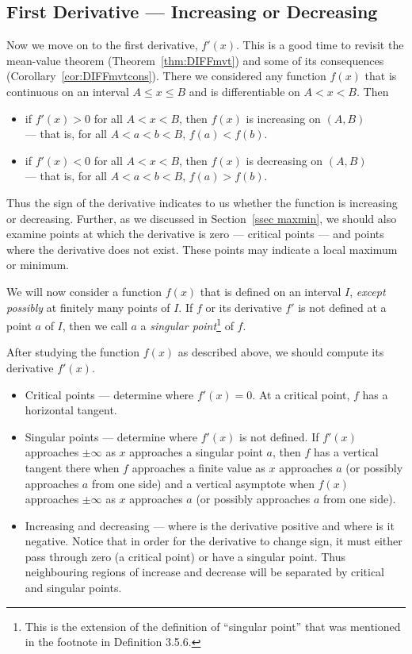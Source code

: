 \subsection{First Derivative --- Increasing or Decreasing}\label{ssec_sketch_FD}
Now we move on to the first derivative, $f'(x)$. This is a good time to revisit the
mean-value theorem (Theorem~\ref{thm:DIFFmvt}) and some of its consequences
(Corollary~\ref{cor:DIFFmvtcons}). There we considered any function $f(x)$ that is 
continuous on an interval $A\le x\le B$ and is differentiable on $A<x<B$. Then
\begin{itemize}
 \item if $f'(x)>0$ for all $A<x<B$, then $f(x)$ is increasing on $(A,B)$\\
  --- that is, for all $A<a<b<B$, $f(a)< f(b)$.
 \item if $f'(x)<0$ for all $A<x<B$, then $f(x)$ is decreasing on $(A,B)$\\
  --- that is, for all $A<a<b<B$, $f(a) > f(b)$.
\end{itemize}
Thus the sign of the derivative indicates to us whether the function is increasing or
decreasing. Further, as we discussed in Section~\ref{ssec maxmin}, we should also examine
points at which the derivative is zero --- critical points --- and points where the derivative
does not exist. These points may indicate a local maximum or minimum.

We will now consider a function $f(x)$ that is defined on an interval $I$, 
\emph{except possibly} at finitely many points of $I$. If $f$ or its derivative $f'$ 
is not defined at a point $a$ of $I$, then we call $a$ a 
\emph{singular point}\footnote{This is the extension of the definition of ``singular point'' that was mentioned in the footnote in Definition 3.5.6.} of $f$.

After studying the function $f(x)$ as described above, we should compute its derivative
$f'(x)$.
\begin{itemize}
 \item Critical points --- determine where $f'(x)=0$. At a critical point, $f$ has a
horizontal tangent.
 \item Singular points --- determine where $f'(x)$ is not defined.  If $f'(x)$
approaches $\pm\infty$ as $x$ approaches a singular point $a$, then $f$ has a
vertical tangent there when $f$ approaches a finite value as $x$ approaches $a$
(or possibly approaches $a$ from one side) and a vertical asymptote when $f(x)$
approaches $\pm\infty$ as $x$ approaches $a$ (or possibly approaches $a$ from
one side).

 \item Increasing and decreasing --- where is the derivative positive and where is it
negative. Notice that in order for the derivative to change sign, it must either pass
through zero (a critical point) or have a singular point. Thus neighbouring regions of
increase and decrease will be separated by critical and singular points.
\end{itemize}

